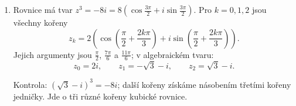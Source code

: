 \documentclass[a4paper,10pt]{article}
\begin{document}
\begin{enumerate}
\item Rovnice má tvar $z^3=-8i
=8(\cos\frac{3\pi}2+i\sin\frac{3\pi}2)$.
Pro $k=0,1,2$ jsou všechny kořeny
\[
z_k=2\left(\cos\left(\frac\pi2+\frac{2k\pi}3\right)
+i\sin\left(\frac\pi2+\frac{2k\pi}3\right)\right).
\]
Jejich argumenty jsou $\frac\pi2$, $\frac{7\pi}6$
a $\frac{11\pi}6$; v algebraickém tvaru:
\[
z_0=2i,\qquad z_1=-\sqrt3-i,\qquad z_2=\sqrt3-i.
\]
\begin{center}
\end{center}
Kontrola: $(\sqrt3-i)^3=-8i$;
další kořeny získáme násobením třetími kořeny jedničky.
Jde o tři různé kořeny kubické rovnice.
\end{enumerate}
\end{document}
